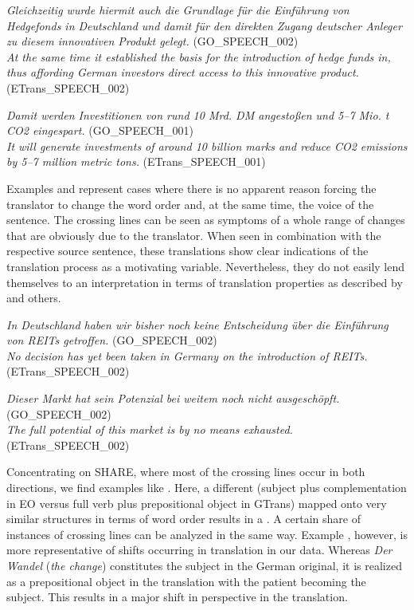 \documentclass[output=paper]{LSP/langsci}
\begin{document}
\ea \label{ex:culo:29}
     \ea \textit{Gleichzeitig wurde hiermit auch die Grundlage für die Einführung von Hedgefonds in Deutschland und damit für den direkten Zugang deutscher Anleger zu diesem innovativen Produkt gelegt.} (GO\_SPEECH\_002)\\
      \ex \textit{At the same time it established the basis for the introduction of hedge funds in, thus affording German investors direct access to this innovative product.} (ETrans\_SPEECH\_002)
      \z
\z


\ea \label{ex:culo:30}
   \ea \textit{Damit werden Investitionen von rund 10 Mrd. DM angestoßen und 5--7 Mio. t CO2 eingespart.} (GO\_SPEECH\_001)\\
      \ex \textit{It will generate investments of around 10 billion marks and reduce CO2 emissions by 5--7 million metric tons.} (ETrans\_SPEECH\_001) 
      \z
\z

Examples  and  represent cases where there is no apparent reason forcing the translator to change the word order and, at the same time, the voice of the sentence. The crossing lines can be seen as symptoms of a whole range of changes that are obviously due to the translator. When seen in combination with the respective source sentence, these translations show clear indications of the translation process as a motivating variable. Nevertheless, they do not easily lend themselves to an interpretation in terms of translation properties as described by \citet{Baker1996} and others. 

\ea \label{ex:culo:31}
    \ea \textit{In Deutschland haben wir bisher noch keine Entscheidung über die Einführung von REITs getroffen. }(GO\_SPEECH\_002)\\
    \ex \textit{No decision has yet been taken in Germany on the introduction of REITs.} (ETrans\_SPEECH\_002) 
    \z
\z


\ea \label{ex:culo:32}
    \ea \textit{Dieser Markt hat sein Potenzial bei weitem noch nicht ausgeschöpft.} (GO\_SPEECH\_002)\\
     \ex \textit{The full potential of this market is by no means exhausted.} (ETrans\_SPEECH\_002)
     \z
\z

Concentrating on SHARE, where most of the crossing lines occur in both directions, we find examples like . Here, a different  (subject  plus complementation in EO versus full verb plus prepositional object in GTrans) mapped onto very similar structures in terms of word order results in a . A certain share of instances of crossing lines can be analyzed in the same way. Example , however, is more representative of shifts occurring in translation in our data. Whereas \textit{Der Wandel} (\textit{the change}) constitutes the subject in the German original, it is realized as a prepositional object in the translation with the patient becoming the subject. This results in a major shift in perspective in the translation. 
\end{document}
